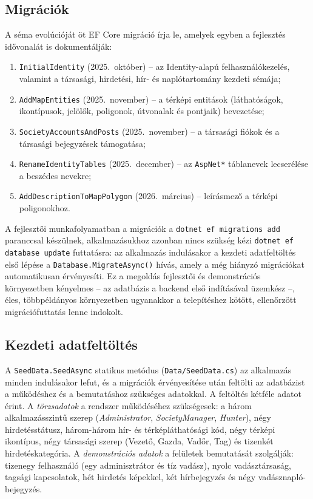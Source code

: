 \subsection{Migrációk}

A séma evolúcióját öt EF Core migráció írja le, amelyek egyben a fejlesztés idővonalát is
dokumentálják:

\begin{enumerate}[nosep]
	\item \texttt{InitialIdentity} (2025.~október) -- az Identity-alapú felhasználókezelés,
	      valamint a társasági, hirdetési, hír- és naplótartomány kezdeti sémája;
	\item \texttt{AddMapEntities} (2025.~november) -- a térképi entitások (láthatóságok,
	      ikontípusok, jelölők, poligonok, útvonalak és pontjaik) bevezetése;
	\item \texttt{SocietyAccountsAndPosts} (2025.~november) -- a társasági fiókok és a
	      társasági bejegyzések támogatása;
	\item \texttt{RenameIdentityTables} (2025.~december) -- az \texttt{AspNet*} táblanevek
	      lecserélése a beszédes nevekre;
	\item \texttt{AddDescriptionToMapPolygon} (2026.~március) -- leírásmező a térképi
	      poligonokhoz.
\end{enumerate}

A fejlesztői munkafolyamatban a migrációk a \texttt{dotnet ef migrations add} paranccsal
készülnek, alkalmazásukhoz azonban nincs szükség kézi \texttt{dotnet ef database update}
futtatásra: az alkalmazás indulásakor a kezdeti adatfeltöltés első lépése a
\texttt{Database.MigrateAsync()} hívás, amely a még hiányzó migrációkat automatikusan érvényesíti.
Ez a megoldás fejlesztői és demonstrációs környezetben kényelmes -- az adatbázis a backend első
indításával üzemkész --, éles, többpéldányos környezetben ugyanakkor a telepítéshez kötött,
ellenőrzött migrációfuttatás lenne indokolt.

\subsection{Kezdeti adatfeltöltés}

A \texttt{SeedData.SeedAsync} statikus metódus (\texttt{Data/SeedData.cs}) az alkalmazás minden
indulásakor lefut, és a migrációk érvényesítése után feltölti az adatbázist a működéshez és a
bemutatáshoz szükséges adatokkal. A feltöltés kétféle adatot érint. A \emph{törzsadatok} a rendszer
működéséhez szükségesek: a három alkalmazásszintű szerep (\emph{Administrator},
\emph{SocietyManager}, \emph{Hunter}), négy hirdetésstátusz, három-három hír- és térképláthatósági
kód, négy térképi ikontípus, négy társasági szerep (Vezető, Gazda, Vadőr, Tag) és tizenkét
hirdetéskategória. A \emph{demonstrációs adatok} a felületek bemutatását szolgálják: tizenegy
felhasználó (egy adminisztrátor és tíz vadász), nyolc vadásztársaság, tagsági kapcsolatok, hét
hirdetés képekkel, két hírbejegyzés és négy vadásznapló-bejegyzés.

